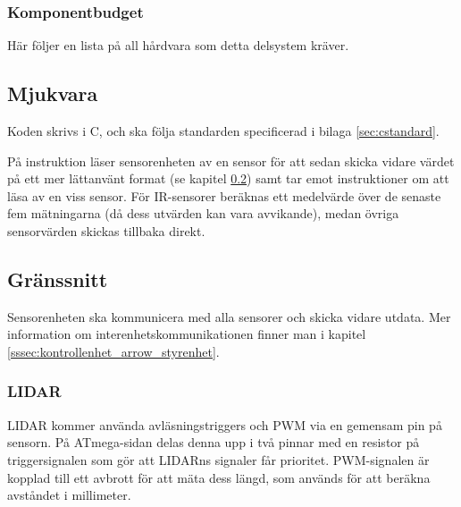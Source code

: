 \documentclass[a4paper,11pt]{article}
\begin{document}
\subsubsection{Komponentbudget}
Här följer en lista på all hårdvara som detta delsystem kräver.

\begin{HardwareList}
\end{HardwareList}

\subsection{Mjukvara}

Koden skrivs i C, och ska följa standarden specificerad i bilaga \ref{sec:cstandard}.

På instruktion läser sensorenheten av en sensor för att sedan skicka vidare värdet på ett mer lättanvänt format (se kapitel \ref{ssec:sensorInterface}) samt tar emot instruktioner om att läsa av en viss sensor. För IR-sensorer beräknas ett medelvärde över de senaste fem mätningarna (då dess utvärden kan vara avvikande), medan övriga sensorvärden skickas tillbaka direkt.

\subsection{Gränssnitt} \label{ssec:sensorInterface}
Sensorenheten ska kommunicera med alla sensorer och skicka vidare utdata. Mer information om interenhetskommunikationen finner man i kapitel \ref{sssec:kontrollenhet_arrow_styrenhet}.


\subsubsection{LIDAR}
LIDAR kommer använda avläsningstriggers och PWM via en gemensam pin på sensorn. På ATmega-sidan delas denna upp i två pinnar med en resistor på triggersignalen som gör att LIDARns signaler får prioritet. PWM-signalen är kopplad till ett avbrott för att mäta dess längd, som används för att beräkna avståndet i millimeter.
\end{document}
